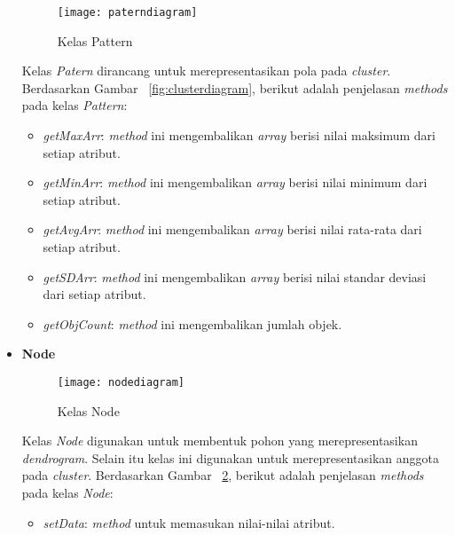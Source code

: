 \begin{itemize}
\begin{figure}[H]
    \centering  
    \texttt{[image: paterndiagram]}  
    \caption[Kelas Pattern]{Kelas Pattern} 
    \label{fig:paterndiagram} 
\end{figure}

Kelas \textit{Patern} dirancang untuk merepresentasikan pola pada \textit{cluster}. Berdasarkan Gambar ~\ref{fig:clusterdiagram}, berikut adalah penjelasan \textit{methods} pada kelas \textit{Pattern}:

\begin{itemize}

\item \textit{getMaxArr}: \textit{method} ini mengembalikan \textit{array} berisi nilai maksimum dari setiap atribut.

\item \textit{getMinArr}: \textit{method} ini mengembalikan \textit{array} berisi nilai minimum dari setiap atribut.

\item \textit{getAvgArr}: \textit{method} ini mengembalikan \textit{array} berisi nilai rata-rata dari setiap atribut.

\item \textit{getSDArr}: \textit{method} ini mengembalikan \textit{array} berisi nilai standar deviasi dari setiap atribut.

\item \textit{getObjCount}: \textit{method} ini mengembalikan jumlah objek.\\
 
\end{itemize}


\item \textbf{Node}\\

\begin{figure}[H]
    \centering  
    \texttt{[image: nodediagram]}  
    \caption[Kelas Node]{Kelas Node} 
    \label{fig:nodediagram} 
\end{figure}

Kelas \textit{Node} digunakan untuk membentuk pohon yang merepresentasikan \textit{dendrogram}. Selain itu kelas ini digunakan untuk merepresentasikan anggota pada \textit{cluster}.  Berdasarkan Gambar ~\ref{fig:nodediagram}, berikut adalah penjelasan \textit{methods} pada kelas \textit{Node}:

\begin{itemize}

\item \textit{setData}: \textit{method} untuk memasukan nilai-nilai atribut.


\end{itemize}
\end{itemize}
